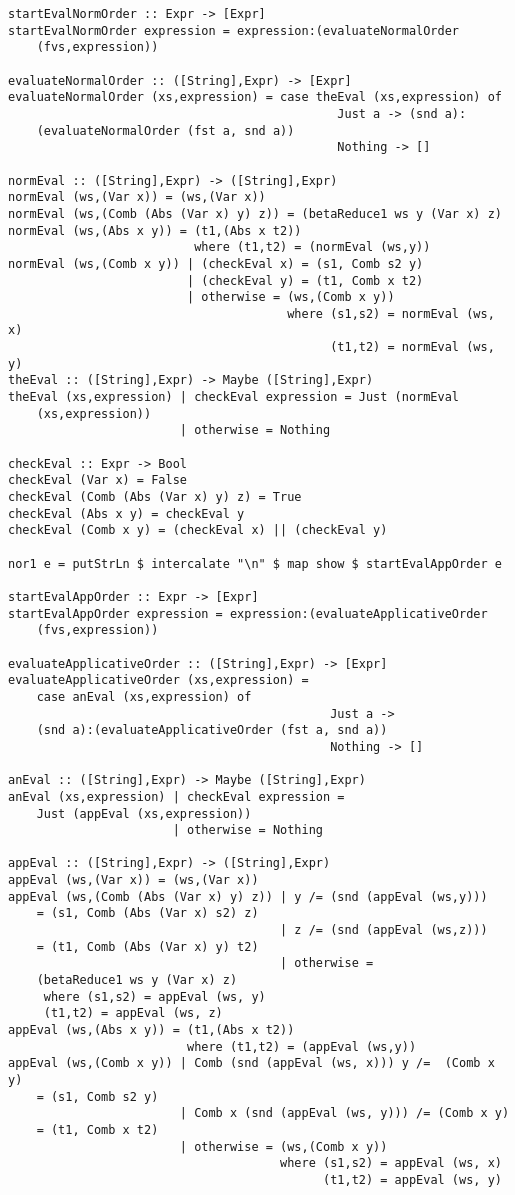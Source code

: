 \documentclass[11pt]{article}
\begin{document}
\begin{verbatim}
startEvalNormOrder :: Expr -> [Expr]
startEvalNormOrder expression = expression:(evaluateNormalOrder 
    (fvs,expression))

evaluateNormalOrder :: ([String],Expr) -> [Expr] 
evaluateNormalOrder (xs,expression) = case theEval (xs,expression) of
                                              Just a -> (snd a):
    (evaluateNormalOrder (fst a, snd a))
                                              Nothing -> []

normEval :: ([String],Expr) -> ([String],Expr)
normEval (ws,(Var x)) = (ws,(Var x))
normEval (ws,(Comb (Abs (Var x) y) z)) = (betaReduce1 ws y (Var x) z)
normEval (ws,(Abs x y)) = (t1,(Abs x t2))
                          where (t1,t2) = (normEval (ws,y))
normEval (ws,(Comb x y)) | (checkEval x) = (s1, Comb s2 y)
                         | (checkEval y) = (t1, Comb x t2)             
                         | otherwise = (ws,(Comb x y))
                                       where (s1,s2) = normEval (ws, x)
                                             (t1,t2) = normEval (ws, y)
theEval :: ([String],Expr) -> Maybe ([String],Expr) 
theEval (xs,expression) | checkEval expression = Just (normEval 
    (xs,expression))
                        | otherwise = Nothing

checkEval :: Expr -> Bool
checkEval (Var x) = False
checkEval (Comb (Abs (Var x) y) z) = True
checkEval (Abs x y) = checkEval y
checkEval (Comb x y) = (checkEval x) || (checkEval y)

nor1 e = putStrLn $ intercalate "\n" $ map show $ startEvalAppOrder e

startEvalAppOrder :: Expr -> [Expr]
startEvalAppOrder expression = expression:(evaluateApplicativeOrder 
    (fvs,expression))

evaluateApplicativeOrder :: ([String],Expr) -> [Expr]
evaluateApplicativeOrder (xs,expression) = 
    case anEval (xs,expression) of
                                             Just a -> 
    (snd a):(evaluateApplicativeOrder (fst a, snd a))
                                             Nothing -> []

anEval :: ([String],Expr) -> Maybe ([String],Expr) 
anEval (xs,expression) | checkEval expression = 
    Just (appEval (xs,expression))
                       | otherwise = Nothing

appEval :: ([String],Expr) -> ([String],Expr) 
appEval (ws,(Var x)) = (ws,(Var x)) 
appEval (ws,(Comb (Abs (Var x) y) z)) | y /= (snd (appEval (ws,y))) 
    = (s1, Comb (Abs (Var x) s2) z)
                                      | z /= (snd (appEval (ws,z))) 
    = (t1, Comb (Abs (Var x) y) t2)
                                      | otherwise =
    (betaReduce1 ws y (Var x) z)    
     where (s1,s2) = appEval (ws, y)
     (t1,t2) = appEval (ws, z)
appEval (ws,(Abs x y)) = (t1,(Abs x t2))
                         where (t1,t2) = (appEval (ws,y))
appEval (ws,(Comb x y)) | Comb (snd (appEval (ws, x))) y /=  (Comb x y) 
    = (s1, Comb s2 y)
                        | Comb x (snd (appEval (ws, y))) /= (Comb x y) 
    = (t1, Comb x t2)             
                        | otherwise = (ws,(Comb x y))
                                      where (s1,s2) = appEval (ws, x)
                                            (t1,t2) = appEval (ws, y)


\end{verbatim}
\end{document}
